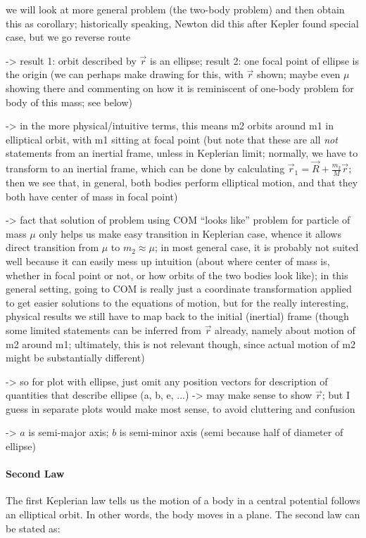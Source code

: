 \documentclass[../class_mech_main.tex]{subfiles}
\begin{document}
we will look at more general problem (the two-body problem) and then obtain this as corollary; historically speaking, Newton did this after Kepler found special case, but we go reverse route

-> result 1: orbit described by $\vec{r}$ is an ellipse; result 2: one focal point of ellipse is the origin (we can perhaps make drawing for this, with $\vec{r}$ shown; maybe even $\mu$ showing there and commenting on how it is reminiscent of one-body problem for body of this mass; see below)

-> in the more physical/intuitive terms, this means m2 orbits around m1 in elliptical orbit, with m1 sitting at focal point (but note that these are all \emph{not} statements from an inertial frame, unless in Keplerian limit; normally, we have to transform to an inertial frame, which can be done by calculating $\vec{r}_1 = \vec{R} + \frac{m_2}{M} \vec{r}$; then we see that, in general, both bodies perform elliptical motion, and that they both have center of mass in focal point)

-> fact that solution of problem using COM \enquote{looks like} problem for particle of mass $\mu$ only helps us make easy transition in Keplerian case, whence it allows direct transition from $\mu$ to $m_2 \approx \mu$; in most general case, it is probably not suited well because it can easily mess up intuition (about where center of mass is, whether in focal point or not, or how orbits of the two bodies look like); in this general setting, going to COM is really just a coordinate transformation applied to get easier solutions to the equations of motion, but for the really interesting, physical results we still have to map back to the initial (inertial) frame (though some limited statements can be inferred from $\vec{r}$ already, namely about motion of m2 around m1; ultimately, this is not relevant though, since actual motion of m2 might be substantially different)



-> so for plot with ellipse, just omit any position vectors for description of quantities that describe ellipse (a, b, e, ...) -> may make sense to show $\vec{r}$; but I guess in separate plots would make most sense, to avoid cluttering and confusion



-> $a$ is semi-major axis; $b$ is semi-minor axis (semi because half of diameter of ellipse)



			\paragraph{Second Law}
The first Keplerian law tells us the motion of a body in a central potential follows an elliptical orbit. In other words, the body moves in a plane. The second law can be stated as:
\end{document}
